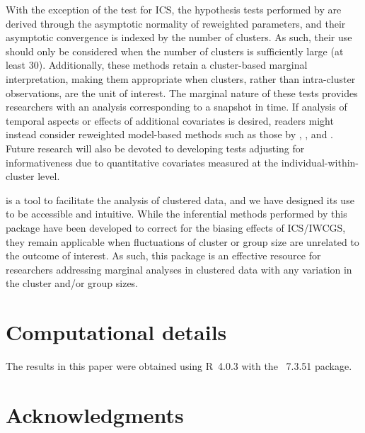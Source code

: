 With the exception of the test for ICS, the hypothesis tests performed by  are derived through the asymptotic normality of reweighted parameters, and their asymptotic convergence is indexed by the number of clusters. As such, their use should only be considered when the number of clusters is sufficiently large (at least 30). Additionally, these methods retain a cluster-based marginal interpretation, making them appropriate when clusters, rather than intra-cluster observations, are the unit of interest. The marginal nature of these tests provides researchers with an analysis corresponding to a snapshot in time. If analysis of temporal aspects or effects of additional covariates is desired, readers might instead consider reweighted model-based methods such as those by \citet{bible16}, \citet{neuhaus11}, and \citet{wang11}. Future research will also be devoted to developing tests adjusting for informativeness due to quantitative covariates measured at the individual-within-cluster level.

 is a tool to facilitate the analysis of clustered data, and we have designed its use to be accessible and intuitive. While the inferential methods performed by this package have been developed to correct for the biasing effects of ICS/IWCGS, they remain applicable when fluctuations of cluster or group size are unrelated to the outcome of interest. As such, this package is an effective resource for researchers addressing marginal analyses in clustered data with any variation in the cluster and/or group sizes. 


\section*{Computational details}


The results in this paper were obtained using
R~4.0.3 with the
~7.3.51 package. 



\section*{Acknowledgments}

